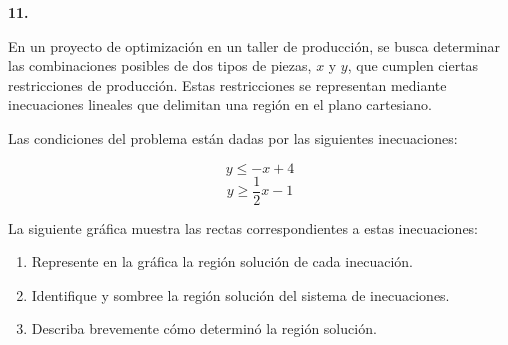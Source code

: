 \textbf{11.}

En un proyecto de optimización en un taller de producción, se busca determinar las combinaciones posibles de dos tipos de piezas, $x$ y $y$, que cumplen ciertas restricciones de producción. Estas restricciones se representan mediante inecuaciones lineales que delimitan una región en el plano cartesiano.

Las condiciones del problema están dadas por las siguientes inecuaciones:

\[
y \leq -x + 4
\]
\[
y \geq \frac{1}{2}x - 1
\]

La siguiente gráfica muestra las rectas correspondientes a estas inecuaciones:

\begin{center}
\end{center}

\begin{enumerate}
\item Represente en la gráfica la región solución de cada inecuación.
\item Identifique y sombree la región solución del sistema de inecuaciones.
\item Describa brevemente cómo determinó la región solución.
\end{enumerate}